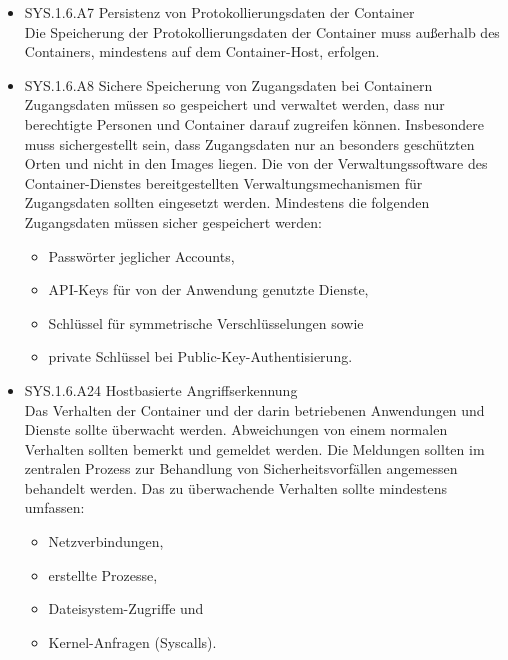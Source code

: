 \begin{itemize}
	\item SYS.1.6.A7 Persistenz von Protokollierungsdaten der Container\\
	Die Speicherung der Protokollierungsdaten der Container muss au{\ss}erhalb des Containers, mindestens auf dem Container-Host, erfolgen.\cite{Grundschutz}\\
	
	\item SYS.1.6.A8 Sichere Speicherung von Zugangsdaten bei Containern \\
	Zugangsdaten m\"ussen so gespeichert und verwaltet werden, dass nur berechtigte Personen und Container darauf zugreifen k\"onnen. Insbesondere muss sichergestellt sein, dass Zugangsdaten nur an besonders gesch\"utzten Orten und nicht in den Images liegen. Die von der Verwaltungssoftware des Container-Dienstes bereitgestellten Verwaltungsmechanismen f\"ur Zugangsdaten sollten eingesetzt werden. Mindestens die folgenden Zugangsdaten m\"ussen sicher gespeichert werden:
\begin{itemize}
	\item Passw\"orter jeglicher Accounts,
	\item API-Keys f\"ur von der Anwendung genutzte Dienste,
	\item Schl\"ussel f\"ur symmetrische Verschl\"usselungen sowie
	\item private Schl\"ussel bei Public-Key-Authentisierung.\cite{Grundschutz}\\
\end{itemize}	

	\item SYS.1.6.A24 Hostbasierte Angriffserkennung \\
	Das Verhalten der Container und der darin betriebenen Anwendungen und Dienste sollte \"uberwacht werden. Abweichungen von einem normalen Verhalten sollten bemerkt und gemeldet werden. Die Meldungen sollten im zentralen Prozess zur Behandlung von Sicherheitsvorf\"allen angemessen behandelt werden. Das zu \"uberwachende Verhalten sollte mindestens umfassen:
\begin{itemize}
	\item Netzverbindungen,
	\item erstellte Prozesse,
	\item Dateisystem-Zugriffe und
	\item Kernel-Anfragen (Syscalls).\cite{Grundschutz}\\
\end{itemize}
	
\end{itemize}
 
